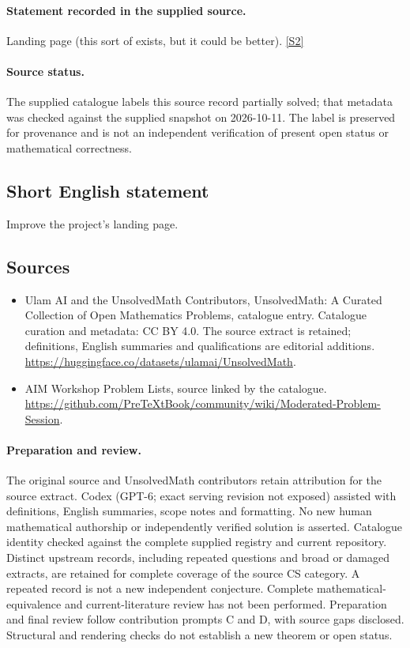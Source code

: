 \documentclass[11pt]{article}
\begin{document}
\paragraph{Statement recorded in the supplied source.}
Landing page (this sort of exists, but it could be better). \href{https://github.com/PreTeXtBook/community/wiki/Moderated-Problem-Session}{[S2]}
\paragraph{Source status.}
The supplied catalogue labels this source record partially solved; that metadata was checked against the supplied snapshot on 2026-10-11. The label is preserved for provenance and is not an independent verification of present open status or mathematical correctness.
\subsection{Short English statement}
Improve the project's landing page.
\subsection{Sources}
\begin{itemize}
\item[S1] Ulam AI and the UnsolvedMath Contributors, UnsolvedMath: A Curated Collection of Open Mathematics Problems, catalogue entry. Catalogue curation and metadata: CC BY 4.0. The source extract is retained; definitions, English summaries and qualifications are editorial additions.
\url{https://huggingface.co/datasets/ulamai/UnsolvedMath}.
\item[S2] AIM Workshop Problem Lists, source linked by the catalogue.
\url{https://github.com/PreTeXtBook/community/wiki/Moderated-Problem-Session}.
\end{itemize}
\paragraph{Preparation and review.}
The original source and UnsolvedMath contributors retain attribution for the source extract. Codex (GPT-6; exact serving revision not exposed) assisted with definitions, English summaries, scope notes and formatting. No new human mathematical authorship or independently verified solution is asserted. Catalogue identity checked against the complete supplied registry and current repository. Distinct upstream records, including repeated questions and broad or damaged extracts, are retained for complete coverage of the source CS category. A repeated record is not a new independent conjecture. Complete mathematical-equivalence and current-literature review has not been performed. Preparation and final review follow contribution prompts C and D, with source gaps disclosed. Structural and rendering checks do not establish a new theorem or open status.
\label{end:statement}
\end{document}
